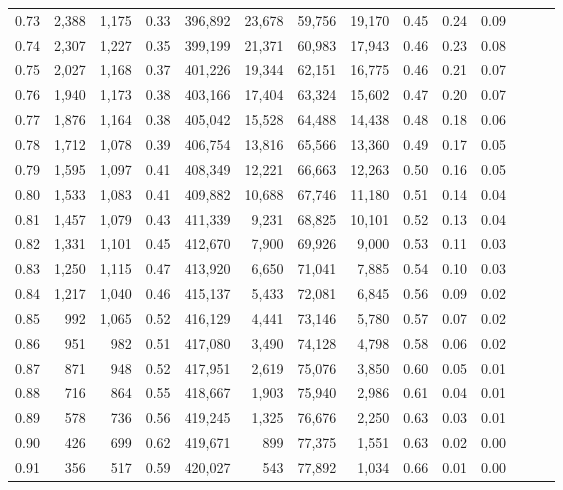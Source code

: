 \begin{tabular}{rrrrrrrrrrrrrr}
0.73 &  2,388 &  1,175 &  0.33 &  396,892 &   23,678 &  59,756 &  19,170 &  0.45 &  0.24 &      0.09 \\
0.74 &  2,307 &  1,227 &  0.35 &  399,199 &   21,371 &  60,983 &  17,943 &  0.46 &  0.23 &      0.08 \\
0.75 &  2,027 &  1,168 &  0.37 &  401,226 &   19,344 &  62,151 &  16,775 &  0.46 &  0.21 &      0.07 \\
0.76 &  1,940 &  1,173 &  0.38 &  403,166 &   17,404 &  63,324 &  15,602 &  0.47 &  0.20 &      0.07 \\
0.77 &  1,876 &  1,164 &  0.38 &  405,042 &   15,528 &  64,488 &  14,438 &  0.48 &  0.18 &      0.06 \\
0.78 &  1,712 &  1,078 &  0.39 &  406,754 &   13,816 &  65,566 &  13,360 &  0.49 &  0.17 &      0.05 \\
0.79 &  1,595 &  1,097 &  0.41 &  408,349 &   12,221 &  66,663 &  12,263 &  0.50 &  0.16 &      0.05 \\
0.80 &  1,533 &  1,083 &  0.41 &  409,882 &   10,688 &  67,746 &  11,180 &  0.51 &  0.14 &      0.04 \\
0.81 &  1,457 &  1,079 &  0.43 &  411,339 &    9,231 &  68,825 &  10,101 &  0.52 &  0.13 &      0.04 \\
0.82 &  1,331 &  1,101 &  0.45 &  412,670 &    7,900 &  69,926 &   9,000 &  0.53 &  0.11 &      0.03 \\
0.83 &  1,250 &  1,115 &  0.47 &  413,920 &    6,650 &  71,041 &   7,885 &  0.54 &  0.10 &      0.03 \\
0.84 &  1,217 &  1,040 &  0.46 &  415,137 &    5,433 &  72,081 &   6,845 &  0.56 &  0.09 &      0.02 \\
0.85 &    992 &  1,065 &  0.52 &  416,129 &    4,441 &  73,146 &   5,780 &  0.57 &  0.07 &      0.02 \\
0.86 &    951 &    982 &  0.51 &  417,080 &    3,490 &  74,128 &   4,798 &  0.58 &  0.06 &      0.02 \\
0.87 &    871 &    948 &  0.52 &  417,951 &    2,619 &  75,076 &   3,850 &  0.60 &  0.05 &      0.01 \\
0.88 &    716 &    864 &  0.55 &  418,667 &    1,903 &  75,940 &   2,986 &  0.61 &  0.04 &      0.01 \\
0.89 &    578 &    736 &  0.56 &  419,245 &    1,325 &  76,676 &   2,250 &  0.63 &  0.03 &      0.01 \\
0.90 &    426 &    699 &  0.62 &  419,671 &      899 &  77,375 &   1,551 &  0.63 &  0.02 &      0.00 \\
0.91 &    356 &    517 &  0.59 &  420,027 &      543 &  77,892 &   1,034 &  0.66 &  0.01 &      0.00 \\

\end{tabular}
